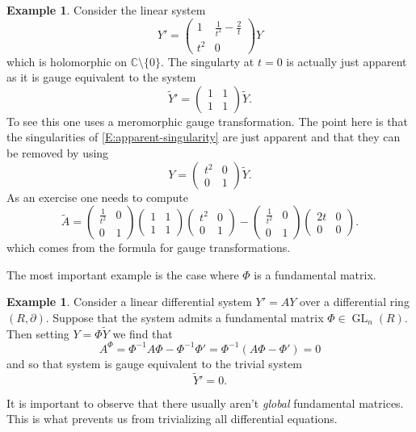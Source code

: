 \documentclass[]{book}
\numberwithin{equation}{section}
\theoremstyle{definition}
\newtheorem{example}[theorem]{Example}
\theoremstyle{remark}
\newcommand{\CC}{\mathbb{C}}
\newcommand{\GL}{\operatorname{GL}}
\begin{document}
\begin{example}
	Consider the linear system 
	\begin{equation}\label{E:apparent-singularity} 
	Y' = \begin{pmatrix}1 & \frac{1}{t^2} -\frac{2}{t} \\ t^2 & 0 \end{pmatrix} Y
	\end{equation}
	which is holomorphic on $\CC\setminus \lbrace 0 \rbrace$. 
	The singularty at $t=0$ is actually just apparent as it is gauge equivalent to the system
	$$ \widetilde{Y}' = \begin{pmatrix} 1 & 1 \\
	1 & 1 
	\end{pmatrix} \widetilde{Y}.$$
	To see this one uses a meromorphic gauge transformation.
	The point here is that the singularities of \eqref{E:apparent-singularity} are just apparent and that they can be removed by using 
	$$ Y =\begin{pmatrix}t^2 & 0 \\ 0 & 1 \end{pmatrix} \widetilde{Y}. $$
	As an exercise one needs to compute 
	$$ \widetilde{A} = \begin{pmatrix} \frac{1}{t^2} & 0 \\
	0 & 1\end{pmatrix} \begin{pmatrix}1 & 1 \\ 1 & 1 \end{pmatrix} \begin{pmatrix} t^2 & 0 \\ 0 & 1 \end{pmatrix} - \begin{pmatrix} \frac{1}{t^2} & 0 \\ 0 & 1 \end{pmatrix} \begin{pmatrix} 2t & 0 \\
	0 & 0 \end{pmatrix}.$$
	which comes from the formula for gauge transformations.
\end{example}

The most important example is the case where $\Phi$ is a fundamental matrix. 
\begin{example}
	Consider a linear differential system $Y'=AY$ over a differential ring $(R,\partial)$. 
	Suppose that the system admits a fundamental matrix $\Phi \in \GL_n(R)$. 
	Then setting $Y = \Phi \widetilde{Y}$ we find that 
	$$ A^{\Phi} = \Phi^{-1} A \Phi - \Phi^{-1} \Phi' = \Phi^{-1}( A\Phi - \Phi') =0 $$
	and so that system is gauge equivalent to the trivial system 
	$$ \widetilde{Y}' =0.$$
\end{example}
It is important to observe that there usually aren't \emph{global} fundamental matrices.
This is what prevents us from trivializing all differential equations.
\end{document}
